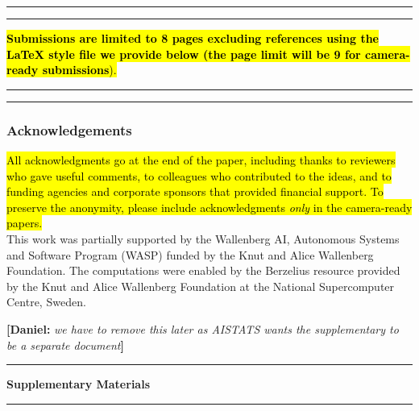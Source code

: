 \documentclass[twoside]{article}
\newcommand{\daniel}[1]{{\color{violet}\textbf{[Daniel:} \textit{#1}\textbf{]}}}
\begin{document}
\begin{abstract}
\end{abstract}










% 





\clearpage
\hrule\hrule
\hl{\textbf{Submissions are limited to 8 pages excluding references using the LaTeX style file we provide below (the page limit will be 9 for camera-ready submissions}).}
\hrule\hrule



\subsubsection*{Acknowledgements}
\hl{
All acknowledgments go at the end of the paper, including thanks to reviewers who gave useful comments, to colleagues who contributed to the ideas, and to funding agencies and corporate sponsors that provided financial support. 
To preserve the anonymity, please include acknowledgments \emph{only} in the camera-ready papers.
}\\
This work was partially supported by the Wallenberg AI, Autonomous Systems and Software Program (WASP) funded by the Knut and Alice Wallenberg Foundation. %
The computations were enabled by the Berzelius resource provided by the Knut and Alice Wallenberg Foundation at the National Supercomputer Centre, Sweden. %












\clearpage








\clearpage
\appendix
\onecolumn
\daniel{we have to remove this later as AISTATS wants the supplementary to be a separate document}
\hrule
\begin{center}
    \textbf{\Large{Supplementary Materials}}
\end{center}
\hrule

\end{document}
